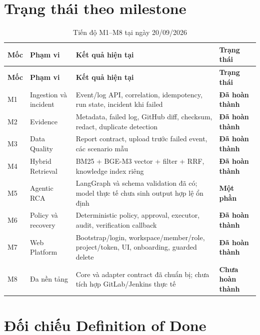 \documentclass[12pt,a4paper,oneside]{report}
\newcommand{\statusdone}{\textcolor{DataOpsGreen}{\textbf{Đã hoàn thành}}}
\newcommand{\statuspartial}{\textcolor{DataOpsAmber}{\textbf{Một phần}}}
\newcommand{\statusnext}{\textcolor{DataOpsRed}{\textbf{Chưa hoàn thành}}}
\begin{document}
\section{Trạng thái theo milestone}

\begin{longtable}{C{1.2cm} L{4.2cm} L{6.0cm} L{2.4cm}}
\caption{Tiến độ M1--M8 tại ngày 20/09/2026}\label{tab:milestones}\\
\toprule
\textbf{Mốc} & \textbf{Phạm vi} & \textbf{Kết quả hiện tại} & \textbf{Trạng thái} \\
\midrule
\endfirsthead
\toprule
\textbf{Mốc} & \textbf{Phạm vi} & \textbf{Kết quả hiện tại} & \textbf{Trạng thái} \\
\midrule
\endhead
M1 & Ingestion và incident & Event/log API, correlation, idempotency, run state, incident khi failed & \statusdone \\
M2 & Evidence & Metadata, failed log, GitHub diff, checksum, redact, duplicate detection & \statusdone \\
M3 & Data Quality & Report contract, upload trước failed event, các scenario mẫu & \statusdone \\
M4 & Hybrid Retrieval & BM25 + BGE-M3 vector + filter + RRF, knowledge index riêng & \statusdone \\
M5 & Agentic RCA & LangGraph và schema validation đã có; model thực tế chưa sinh output hợp lệ ổn định & \statuspartial \\
M6 & Policy và recovery & Deterministic policy, approval, executor, audit, verification callback & \statusdone \\
M7 & Web Platform & Bootstrap/login, workspace/member/role, project/token, UI, onboarding, guarded delete & \statusdone \\
M8 & Đa nền tảng & Core và adapter contract đã chuẩn bị; chưa tích hợp GitLab/Jenkins thực tế & \statusnext \\
\bottomrule
\end{longtable}

\section{Đối chiếu Definition of Done}
\end{document}
